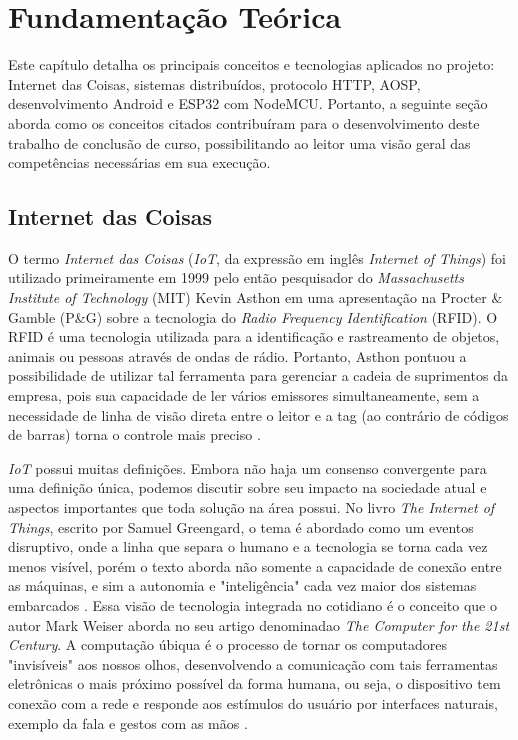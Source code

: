 \chapter{Fundamentação Teórica}

Este capítulo detalha os principais conceitos e tecnologias aplicados no projeto: Internet das Coisas, sistemas distribuídos, protocolo HTTP, AOSP, desenvolvimento Android e ESP32 com NodeMCU. Portanto, 
a seguinte seção aborda como os conceitos citados contribuíram para o desenvolvimento deste trabalho de conclusão de curso, possibilitando
ao leitor uma visão geral das competências necessárias em sua execução. 

\section{Internet das Coisas}

O termo \textit{Internet das Coisas} (\textit{IoT}, da expressão em inglês \textit{Internet of Things}) foi utilizado primeiramente em 1999 pelo então pesquisador do \textit{Massachusetts Institute of Technology} (MIT) Kevin Asthon em uma apresentação na Procter \& Gamble (P\&G) sobre a tecnologia do \textit{Radio Frequency Identification} (RFID). O RFID é uma tecnologia utilizada para a identificação e rastreamento de objetos, animais ou pessoas através de ondas de rádio. Portanto, Asthon pontuou a possibilidade de utilizar tal ferramenta para gerenciar a cadeia de suprimentos da empresa, pois sua capacidade de ler vários emissores simultaneamente, sem a necessidade de linha de visão direta entre o leitor e a tag (ao contrário de códigos de barras) torna o controle mais preciso \cite{iot-first-definition}. 

\textit{IoT} possui muitas definições. Embora não haja um consenso convergente para uma definição única, podemos discutir sobre seu impacto na sociedade atual e aspectos importantes que toda solução na área possui. No livro \textit{The Internet  of Things}, escrito por Samuel Greengard, o tema é abordado como um eventos disruptivo, onde a linha que separa o humano e a tecnologia se torna cada vez menos visível, porém o texto aborda não somente a capacidade de conexão entre as máquinas, e sim a autonomia e "inteligência" cada vez maior dos sistemas embarcados \cite[pp. 17]{book-iot}. Essa visão de tecnologia integrada no cotidiano é o conceito que o autor Mark Weiser aborda no seu artigo denominadao \textit{The Computer for the 21st Century}. A computação úbiqua é o processo de tornar os computadores "invisíveis" aos nossos olhos, desenvolvendo a comunicação com tais ferramentas eletrônicas o mais próximo possível da forma humana, ou seja, o dispositivo tem conexão com a rede e responde aos estímulos do usuário por interfaces naturais, exemplo da fala e gestos com as mãos \cite{ubiquitous-computing}.

